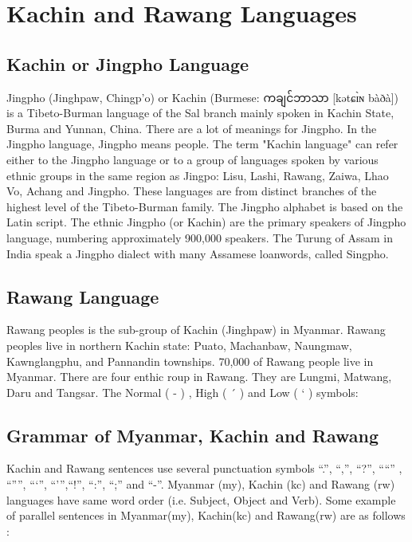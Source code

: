\documentclass[conference]{IEEEtran}
\newcommand{\quotes}[1]{``#1''}
\begin{document}
\section{Kachin and Rawang Languages}
\label{sec:KachinLanguage}
\subsection{Kachin or Jingpho Language}
\label{subsec:KachinOrJingpho}
Jingpho (Jinghpaw, Chingp'o) or Kachin (Burmese: {\padauktext ကချင်ဘာသာ} [kətɕɪ̀ɴ bàðà]) is a Tibeto-Burman language of the Sal branch mainly spoken in Kachin State, Burma and Yunnan, China. There are a lot of meanings for Jingpho. In the Jingpho language, Jingpho means people. The term "Kachin language" can refer either to the Jingpho language or to a group of languages spoken by various ethnic groups in the same region as Jingpo: Lisu, Lashi, Rawang, Zaiwa, Lhao Vo, Achang and Jingpho. These languages are from distinct branches of the highest level of the Tibeto-Burman family. The Jingpho alphabet is based on the Latin script. The ethnic Jingpho (or Kachin) are the primary speakers of Jingpho language, numbering approximately 900,000 speakers. The Turung of Assam in India speak a Jingpho dialect with many Assamese loanwords, called Singpho.

\subsection{Rawang Language}
\label{subsec:RawangLanguage}
Rawang peoples is the sub-group of Kachin (Jinghpaw) in Myanmar. Rawang peoples live in northern Kachin state: Puato, Machanbaw, Naungmaw, Kawnglangphu, and Pannandin townships. 70,000 of Rawang people live in Myanmar. There are four enthic roup in Rawang. They are Lungmi, Matwang, Daru and  Tangsar. The Normal ( - ) , High ( ´ ) and Low ( ` ) symbols:

\subsection{Grammar of Myanmar, Kachin and Rawang}
\label{subsecsec:Grammar}

Kachin and Rawang sentences use several punctuation symbols \quotes{.}, \quotes{,}, \quotes{?},  \quotes{“} , \quotes{”}, \quotes{‘}, \quotes{’},\quotes{!}, \quotes{:}, \quotes{;} and \quotes{-}. Myanmar (my), Kachin (kc) and Rawang (rw) languages have same word order (i.e. Subject, Object and Verb). Some example of parallel sentences in Myanmar(my), Kachin(kc) and Rawang(rw) are as follows :\\
\end{document}
